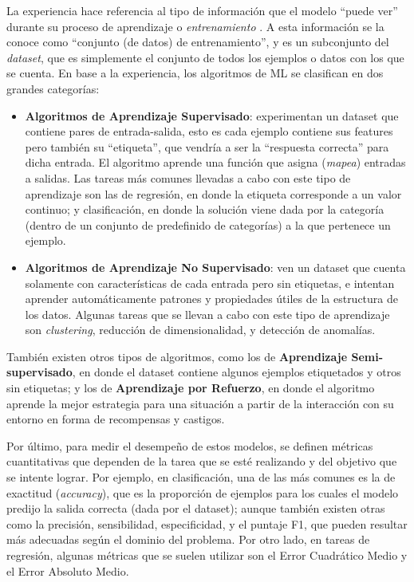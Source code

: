 \documentclass[../../main.tex]{subfiles}
\begin{document}
La experiencia hace referencia al tipo de información que el modelo ``puede ver'' durante su proceso de aprendizaje o \textit{entrenamiento} \cite{hands-on-ML-sklearn-tf}. A esta información se la conoce como ``conjunto (de datos) de entrenamiento'', y es un subconjunto del \textit{dataset}, que es simplemente el conjunto de todos los ejemplos o datos con los que se cuenta. En base a la experiencia, los algoritmos de ML se clasifican en dos grandes categorías:
\begin{itemize}
    \item \textbf{Algoritmos de Aprendizaje Supervisado}: experimentan un dataset que contiene pares de entrada-salida, esto es cada ejemplo contiene sus features pero también su ``etiqueta'', que vendría a ser la ``respuesta correcta'' para dicha entrada. El algoritmo aprende una función que asigna (\textit{mapea}) entradas a salidas. Las tareas más comunes llevadas a cabo con este tipo de aprendizaje son las de regresión, en donde la etiqueta corresponde a un valor continuo; y clasificación, en donde la solución viene dada por la categoría (dentro de un conjunto de predefinido de categorías) a la que pertenece un ejemplo.
    \item \textbf{Algoritmos de Aprendizaje No Supervisado}: ven un dataset que cuenta solamente con características de cada entrada pero sin etiquetas, e intentan aprender automáticamente patrones y propiedades útiles de la estructura de los datos. Algunas tareas que se llevan a cabo con este tipo de aprendizaje son \textit{clustering}, reducción de dimensionalidad, y detección de anomalías.
\end{itemize}
También existen otros tipos de algoritmos, como los de \textbf{Aprendizaje Semi-supervisado}, en donde el dataset contiene algunos ejemplos etiquetados y otros sin etiquetas; y los de \textbf{Aprendizaje por Refuerzo}, en donde el algoritmo aprende la mejor estrategia para una situación a partir de la interacción con su entorno en forma de recompensas y castigos.

Por último, para medir el desempeño de estos modelos, se definen métricas cuantitativas que dependen de la tarea que se esté realizando y del objetivo que se intente lograr. Por ejemplo, en clasificación, una de las más comunes es la de exactitud (\textit{accuracy}), que es la proporción de ejemplos para los cuales el modelo predijo la salida correcta (dada por el dataset); aunque también existen otras como la precisión, sensibilidad, especificidad, y el puntaje F1, que pueden resultar más adecuadas según el dominio del problema. Por otro lado, en tareas de regresión, algunas métricas que se suelen utilizar son el Error Cuadrático Medio y el Error Absoluto Medio. 
\end{document}
